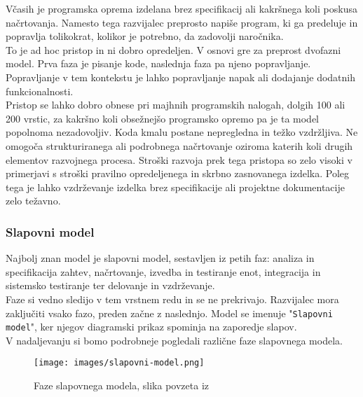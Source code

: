 \documentclass[a4paper,12pt,openright]{book}
\begin{document}
Včasih je programska oprema izdelana brez specifikacij ali kakršnega koli poskusa načrtovanja. Namesto tega razvijalec preprosto napiše program, ki ga predeluje in popravlja tolikokrat, kolikor je potrebno, da zadovolji naročnika. \\
To je ad hoc pristop in ni dobro opredeljen. V osnovi gre za preprost dvofazni model. Prva faza je pisanje kode, naslednja faza pa njeno popravljanje. Popravljanje v tem kontekstu je lahko popravljanje napak ali dodajanje dodatnih funkcionalnosti. \\
Pristop se lahko dobro obnese pri majhnih programskih nalogah, dolgih 100 ali 200 vrstic, za kakršno koli obsežnejšo programsko opremo  pa je ta model popolnoma nezadovoljiv. Koda kmalu postane nepregledna in težko vzdržljiva. Ne omogoča strukturiranega ali podrobnega načrtovanje oziroma katerih koli drugih elementov razvojnega procesa. Stroški razvoja prek tega pristopa so zelo visoki v primerjavi s stroški pravilno opredeljenega in skrbno zasnovanega izdelka. Poleg tega je lahko vzdrževanje izdelka brez specifikacije ali projektne dokumentacije zelo težavno. \cite{schach1996classical}
\subsubsection{Slapovni model}
Najbolj znan model je slapovni model, sestavljen iz petih faz: analiza in specifikacija zahtev, načrtovanje, izvedba in testiranje enot, integracija in sistemsko testiranje ter delovanje in vzdrževanje. \\
Faze si vedno sledijo v tem vrstnem redu in se ne prekrivajo. Razvijalec mora zaključiti vsako fazo, preden začne z naslednjo. Model se imenuje "\texttt{Slapovni model}", ker njegov diagramski prikaz spominja na zaporedje slapov. \cite{aggarwal2005software} \\
V nadaljevanju si bomo podrobneje pogledali različne faze slapovnega modela.

\begin{figure}[H]
    \centering
    \texttt{[image: images/slapovni-model.png]}
    \caption{Faze slapovnega modela, slika povzeta iz \cite{mercun2012}}
    \label{fig:enter-label}
\end{figure}
\end{document}
